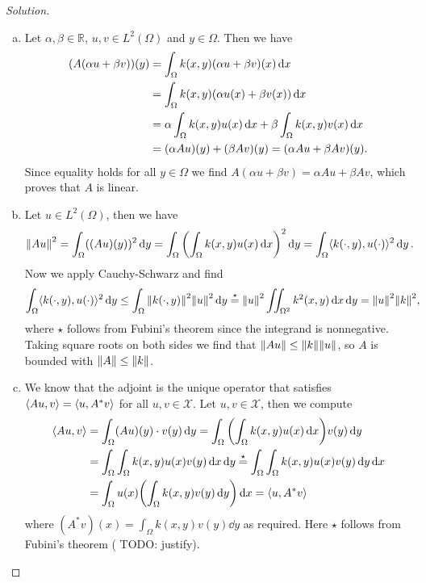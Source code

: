 \documentclass{article}
\theoremstyle{plain}
\theoremstyle{remark}
\newenvironment{solution}{\begin{proof}[Solution]\renewcommand\qedsymbol{}}{\end{proof}}
\newcommand{\Bb}{\mathbb}
\newcommand{\Cal}{\mathcal}
\newcommand{\RR}{\Bb R}
\DeclarePairedDelimiter{\ang}{\langle}{\rangle}
\newcommand\TODO{{\color{red} TODO: }}
\newcommand\XX{\Cal X}
\begin{document}
\begin{solution}

	
	\begin{enumerate}[(a)]
		\item Let $\alpha, \beta \in \RR$, $u, v \in L^2(\Omega)$ and $y \in \Omega$. Then we have
		\begin{align*}
			(A(\alpha u + \beta v))(y) &= \int_\Omega k(x, y) (\alpha u + \beta v)(x) \dd{x} \\
			&= \int_\Omega k(x, y) \qty(\alpha u(x) + \beta v(x)) \dd{x}\\
			&= \alpha \int_\Omega k(x, y) u(x) \dd{x} + \beta \int_\Omega k(x, y) v(x) \dd{x} \\
			&= (\alpha A u)(y) + (\beta Av)(y) = (\alpha Au + \beta Av)(y). 
		\end{align*}
	Since equality holds for all $y \in \Omega$ we find $A(\alpha u + \beta v) = \alpha A u + \beta A v$, which proves that $A$ is linear. 
	\item Let $u \in L^2(\Omega)$, then we have
	\begin{align*}
	\norm{Au}^2 &= \int_\Omega ((Au)(y))^2 \dd{y} = \int_\Omega \qty( \int_\Omega k(x, y) u(x) \dd{x})^2 \dd{y} = \int_\Omega \ang{k(\cdot, y), u(\cdot)}^2 \dd{y}. 
	\end{align*}
Now we apply Cauchy-Schwarz and find
\begin{align*}
	\int_\Omega \ang{k(\cdot, y), u(\cdot)}^2 \dd{y} &\leq \int_\Omega \norm{k(\cdot, y)}^2 \norm{u}^2 \dd{y} \overset\star= \norm{u}^2 \iint_{\Omega^2} k^2(x, y) \dd{x}\dd{y} = \norm{u}^2 \norm{k}^2, 
\end{align*}
where $\star$ follows from Fubini's theorem since the integrand is nonnegative. 
Taking square roots on both sides we find that $\norm{Au}\leq \norm{k}\norm{u}$, so $A$ is bounded with $\norm{A} \leq \norm{k}$. 

\item We know that the adjoint is the unique operator that satisfies $\ang{Au, v} = \ang{u, A^*v}$ for all $u, v \in \XX$. Let $u, v \in \XX$, then we compute
\begin{align*}
	\ang{Au, v} &= \int_\Omega (Au)(y)\cdot  v(y) \dd{y} = \int_\Omega \qty(\int_\Omega k(x, y) u(x) \dd{x}) v(y) \dd{y} \\
	&= \int_\Omega\int_\Omega k(x, y) u(x) v(y) \dd{x} \dd{y} \overset\star= \int_\Omega\int_\Omega k(x, y) u(x) v(y) \dd{y} \dd{x} \\
	&= \int_\Omega u(x) \qty(\int_\Omega k(x, y) v(y) \dd{y}) \dd{x} = \ang{u, A^*v}
\end{align*}
where $(A^* v)(x) = \int_\Omega k(x, y) v(y) \dd{y}$ as required. Here $\star$ follows from Fubini's theorem (\TODO justify). 


\end{enumerate}
\end{solution}
\end{document}
